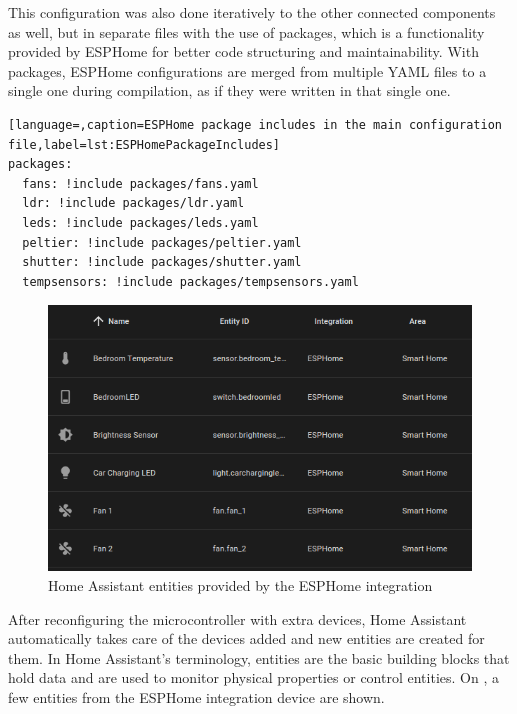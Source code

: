 This configuration was also done iteratively to the other connected components as well, but in separate files with the use of packages, which is a functionality provided by ESPHome for better code structuring and maintainability. \cite{ESPHomePackages} With packages, ESPHome configurations are merged from multiple YAML files to a single one during compilation, as if they were written in that single one.

\begin{lstlisting}[language=,caption=ESPHome package includes in the main configuration file,label=lst:ESPHomePackageIncludes]
packages:
  fans: !include packages/fans.yaml
  ldr: !include packages/ldr.yaml
  leds: !include packages/leds.yaml
  peltier: !include packages/peltier.yaml
  shutter: !include packages/shutter.yaml
  tempsensors: !include packages/tempsensors.yaml
\end{lstlisting}

\begin{figure}[!ht]
  \centering
  \includegraphics[width=150mm, keepaspectratio]{figures/esphome_entities.png}
  \caption{Home Assistant entities provided by the ESPHome integration}
  \label{fig:HAesphomeEntities}
\end{figure}

After reconfiguring the microcontroller with extra devices, Home Assistant automatically takes care of the devices added and new entities are created for them. In Home Assistant's terminology, entities are the basic building blocks that hold data and are used to monitor physical properties or control entities. \cite{HAConceptsTerminology} On , a few entities from the ESPHome integration device are shown. 

